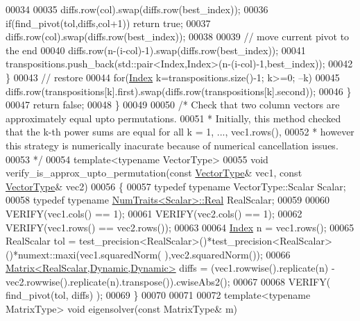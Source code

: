 \begin{DoxyCode}
00034       
00035       diffs.row(col).swap(diffs.row(best\_index));
00036       \textcolor{keywordflow}{if}(find\_pivot(tol,diffs,col+1)) \textcolor{keywordflow}{return} \textcolor{keyword}{true};
00037       diffs.row(col).swap(diffs.row(best\_index));
00038       
00039       \textcolor{comment}{// move current pivot to the end}
00040       diffs.row(n-(i-col)-1).swap(diffs.row(best\_index));
00041       transpositions.push\_back(std::pair<Index,Index>(n-(i-col)-1,best\_index));
00042     \}
00043     \textcolor{comment}{// restore}
00044     \textcolor{keywordflow}{for}(\hyperlink{namespace_eigen_a62e77e0933482dafde8fe197d9a2cfde}{Index} k=transpositions.size()-1; k>=0; --k)
00045       diffs.row(transpositions[k].first).swap(diffs.row(transpositions[k].second));
00046   \}
00047   \textcolor{keywordflow}{return} \textcolor{keyword}{false};
00048 \}
00049 
00050 \textcolor{comment}{/* Check that two column vectors are approximately equal upto permutations.}
00051 \textcolor{comment}{ * Initially, this method checked that the k-th power sums are equal for all k = 1, ..., vec1.rows(),}
00052 \textcolor{comment}{ * however this strategy is numerically inacurate because of numerical cancellation issues.}
00053 \textcolor{comment}{ */}
00054 \textcolor{keyword}{template}<\textcolor{keyword}{typename} VectorType>
00055 \textcolor{keywordtype}{void} verify\_is\_approx\_upto\_permutation(\textcolor{keyword}{const} \hyperlink{struct_vector_type}{VectorType}& vec1, \textcolor{keyword}{const} 
      \hyperlink{struct_vector_type}{VectorType}& vec2)
00056 \{
00057   \textcolor{keyword}{typedef} \textcolor{keyword}{typename} VectorType::Scalar Scalar;
00058   \textcolor{keyword}{typedef} \textcolor{keyword}{typename} \hyperlink{group___core___module_struct_eigen_1_1_num_traits}{NumTraits<Scalar>::Real} RealScalar;
00059 
00060   VERIFY(vec1.cols() == 1);
00061   VERIFY(vec2.cols() == 1);
00062   VERIFY(vec1.rows() == vec2.rows());
00063   
00064   \hyperlink{namespace_eigen_a62e77e0933482dafde8fe197d9a2cfde}{Index} n = vec1.rows();
00065   RealScalar tol = test\_precision<RealScalar>()*test\_precision<RealScalar>()*numext::maxi(vec1.squaredNorm(
      ),vec2.squaredNorm());
00066   \hyperlink{group___core___module_class_eigen_1_1_matrix}{Matrix<RealScalar,Dynamic,Dynamic>} diffs = (vec1.rowwise().replicate(n)
       - vec2.rowwise().replicate(n).transpose()).cwiseAbs2();
00067   
00068   VERIFY( find\_pivot(tol, diffs) );
00069 \}
00070 
00071 
00072 \textcolor{keyword}{template}<\textcolor{keyword}{typename} MatrixType> \textcolor{keywordtype}{void} eigensolver(\textcolor{keyword}{const} MatrixType& m)

\end{DoxyCode}
